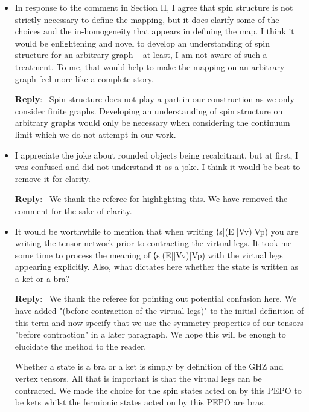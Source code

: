 \documentclass[aps,prx,floatfix,10pt,amssymb,amsfont,amsmath,superscriptaddress,float,nofootinbib,longbibliography,nobalancelastpage]{revtex4-2}
\newenvironment{reply}
   {\medskip \noindent \begin{sf}\textbf{Reply}:\ \color{blue}  }
   {\medskip \end{sf}}
\begin{document}
\begin{itemize}
\item In response to the comment in Section II, I agree that spin structure is not strictly necessary to define the mapping, but it does clarify some of the choices and the in-homogeneity that appears in defining the map. I think it would be enlightening and novel to develop an understanding of spin structure for an arbitrary graph – at least, I am not aware of such a treatment. To me, that would help to make the mapping on an arbitrary graph feel more like a complete story.

\begin{reply}
    Spin structure does not play a part in our construction as we only consider finite graphs. Developing an understanding of spin structure on arbitrary graphs would only be necessary when considering the continuum limit which we do not attempt in our work.
\end{reply}

\item I appreciate the joke about rounded objects being recalcitrant, but at first, I was confused and did not understand it as a joke. I think it would be best to remove it for clarity.

\begin{reply}
    We thank the referee for highlighting this. We have removed the comment for the sake of clarity.
\end{reply}

\item It would be worthwhile to mention that when writing ⟨s|(E||Vv)|Vp) you are writing the tensor network prior to contracting the virtual legs. It took me some time to process the meaning of ⟨s|(E||Vv)|Vp) with the virtual legs appearing explicitly. Also, what dictates here whether the state is written as a ket or a bra?

\begin{reply}
    We thank the referee for pointing out potential confusion here. We have added "(before contraction of the virtual legs)" to the initial definition of this term and now specify that we use the symmetry properties of our tensors "before contraction" in a later paragraph. We hope this will be enough to elucidate the method to the reader. 

    Whether a state is a bra or a ket is simply by definition of the GHZ and vertex tensors. All that is important is that the virtual legs can be contracted. We made the choice for the spin states acted on by this PEPO to be kets whilst the fermionic states acted on by this PEPO are bras.
\end{reply}


\end{itemize}
\end{document}
